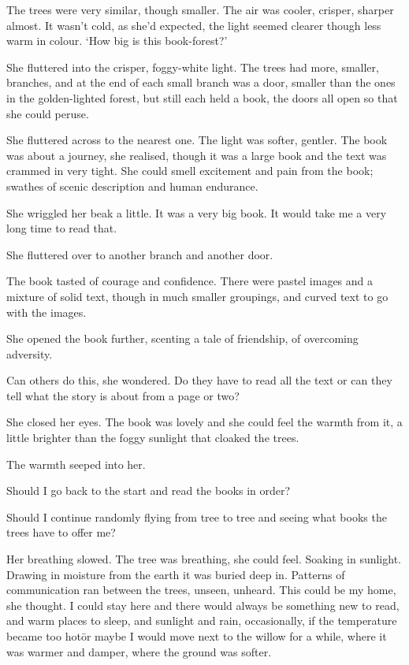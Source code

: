 The trees were very similar, though smaller. The air was cooler,
crisper, sharper almost. It wasn't cold, as she'd expected, the light
seemed clearer though less warm in colour.  `How big is this
book-forest?'

She fluttered into the crisper, foggy-white light. The trees had more,
smaller, branches, and at the end of each small branch was a door,
smaller than the ones in the golden-lighted forest, but still each
held a book, the doors all open so that she could peruse.

She fluttered across to the nearest one. The light was softer,
gentler. The book was about a journey, she realised, though it was a
large book and the text was crammed in very tight. She could smell
excitement and pain from the book; swathes of scenic description and
human endurance.

She wriggled her beak a little. It was a very big book. It would take
me a very long time to read that.

She fluttered over to another branch and another door.

The book tasted of courage and confidence. There were pastel images
and a mixture of solid text, though in much smaller groupings, and
curved text to go with the images.

She opened the book further, scenting a tale of friendship, of
overcoming adversity.

Can others do this, she wondered. Do they have to read all the text or
can they tell what the story is about from a page or two?

She closed her eyes. The book was lovely and she could feel the warmth
from it, a little brighter than the foggy sunlight that cloaked the
trees.

The warmth seeped into her.

Should I go back to the start and read the books in order?

Should I continue randomly flying from tree to tree and seeing what
books the trees have to offer me?

Her breathing slowed. The tree was breathing, she could feel. Soaking
in sunlight. Drawing in moisture from the earth it was buried deep
in. Patterns of communication ran between the trees, unseen,
unheard. This could be my home, she thought. I could stay here and
there would always be something new to read, and warm places to sleep,
and sunlight and rain, occasionally, if the temperature became too
hot\=or maybe I would move next to the willow for a while, where it
was warmer and damper, where the ground was softer.

